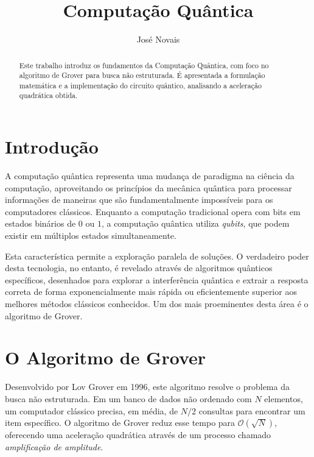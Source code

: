 \documentclass{llncs}
\begin{document}
\title{Computação Quântica}


\author{José Novais}



\date{}


\maketitle
\begin{abstract}
     Este trabalho introduz os fundamentos da Computação Quântica, com foco no algoritmo de Grover para busca não estruturada. É apresentada a formulação matemática e a implementação do circuito quântico, analisando a aceleração quadrática obtida. 
\end{abstract}

\renewcommand{\contentsname}{Índice}
\setcounter{tocdepth}{2}
\tableofcontents

\newpage

\section{Introdução}
A computação quântica representa uma mudança de paradigma na ciência da computação, aproveitando os princípios da mecânica quântica para processar informações de maneiras que são fundamentalmente impossíveis para os computadores clássicos. Enquanto a computação tradicional opera com bits em estados binários de $0$ ou $1$, a computação quântica utiliza \textit{qubits}, que podem existir em múltiplos estados simultaneamente. 

Esta característica permite a exploração paralela de soluções. O verdadeiro poder desta tecnologia, no entanto, é revelado através de algoritmos quânticos específicos, desenhados para explorar a interferência quântica e extrair a resposta correta de forma exponencialmente mais rápida ou eficientemente superior aos melhores métodos clássicos conhecidos. Um dos mais proeminentes desta área é o algoritmo de Grover.

\section{O Algoritmo de Grover}
Desenvolvido por Lov Grover em 1996, este algoritmo resolve o problema da busca não estruturada. Em um banco de dados não ordenado com $N$ elementos, um computador clássico precisa, em média, de $N/2$ consultas para encontrar um item específico. O algoritmo de Grover reduz esse tempo para $\mathcal{O}(\sqrt{N})$, oferecendo uma aceleração quadrática através de um processo chamado \textit{amplificação de amplitude}.
\end{document}
